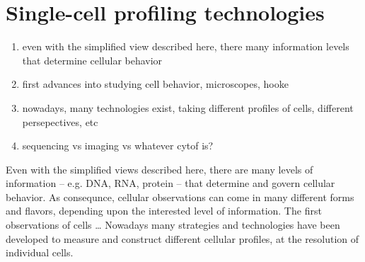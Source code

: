 \section{Single-cell profiling technologies}
\begin{enumerate}
  \item even with the simplified view described here, there many information levels that determine cellular behavior
  \item first advances into studying cell behavior, microscopes, hooke
  \item nowadays, many technologies exist, taking different profiles of cells, different persepectives, etc
  \item sequencing vs imaging vs whatever cytof is? 
\end{enumerate}

Even with the simplified views described here, there are many levels of information -- e.g. DNA, RNA, protein -- that determine and govern cellular behavior.
As consequnce, cellular observations can come in many different forms and flavors, depending upon the interested level of information.
The first observations of cells \ldots %
Nowadays many strategies and technologies have been developed to measure and construct different cellular profiles, at the resolution of individual cells.



